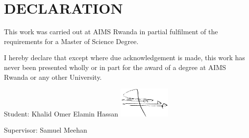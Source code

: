 \chapter*{DECLARATION}
This work was carried out at AIMS Rwanda in partial fulfilment of the requirements for a Master of Science Degree.

I hereby declare that except where due acknowledgement is made, this work has never been presented wholly or in part for the award of a degree at AIMS Rwanda or any other University.

\vspace{1.5cm}

Student: Khalid Omer Elamin Hassan
\includegraphics[height=1.5cm]{images/sign.png}
\vspace{1.5cm}

Supervisor: Samuel Meehan


%
%
%
%
